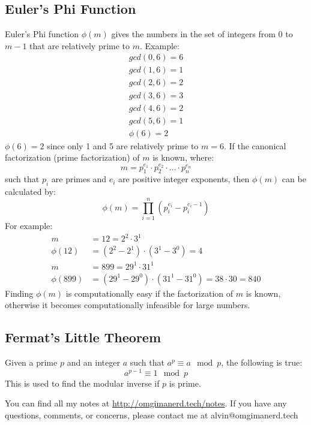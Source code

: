 \documentclass{math}
\begin{document}
\subsection*{Euler's Phi Function}
Euler's Phi function \( \phi(m) \) gives the numbers in the set of integers from
0 to \( m-1 \) that are relatively prime to \( m \). Example:
\begin{align*}
  gcd(0,6) = 6 \\
  gcd(1,6) = 1 \\
  gcd(2,6) = 2 \\
  gcd(3,6) = 3 \\
  gcd(4,6) = 2 \\
  gcd(5,6) = 1 \\
  \phi(6) = 2
\end{align*}
\( \phi(6) = 2 \) since only 1 and 5 are relatively prime to \( m = 6 \). If the
canonical factorization (prime factorization) of \( m \) is known, where:
\[ m = p_1^{e_1}\cdot p_2^{e_2}\cdot\dots\cdot p_n^{e_n} \]
such that \( p_i \) are primes and \( e_i \) are positive integer exponents,
then \( \phi(m) \) can be calculated by:
\[ \phi(m) = \prod_{i=1}^{n}(p_i^{e_i}-p_i^{e_i-1}) \]
For example:
\begin{align*}
  m &= 12 = 2^2\cdot3^1 \\
  \phi(12) &= (2^2-2^1)\cdot(3^1-3^0) = 4 \\
  m &= 899 = 29^1\cdot31^1 \\
  \phi(899) &= (29^1-29^0)\cdot(31^1-31^0) = 38\cdot30 = 840
\end{align*}
Finding \( \phi(m) \) is computationally easy if the factorization of \( m \) is
known, otherwise it becomes computationally infeasible for large numbers.

\subsection*{Fermat's Little Theorem}
Given a prime \( p \) and an integer \( a \) such that \( a^p \equiv a\mod p \),
the following is true:
\[ a^{p-1} \equiv 1\mod p \]
This is used to find the modular inverse if \( p \) is prime.

\begin{center}
  You can find all my notes at \url{http://omgimanerd.tech/notes}. If you have
  any questions, comments, or concerns, please contact me at
  alvin@omgimanerd.tech
\end{center}
\end{document}
